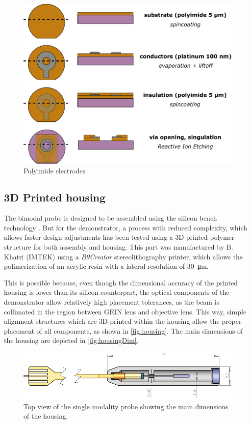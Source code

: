 \documentclass[10pt]{iopart}
\begin{document}
\begin{figure}[h!]\centering \includegraphics[width=\columnwidth]{figures/PIprocess.pdf}
      \caption{Polyimide electrodes}
\end{figure}


\subsection{3D Printed housing}

The bimodal probe is designed to be assembled using the silicon bench technology \cite{Kretschmer}. But for the demonstrator, a process with reduced complexity, which allows faster design adjustments has been tested using a 3D printed polymer structure for both assembly and housing. This part was manufactured by B. Khatri (IMTEK) using a \textit{B9Creator} stereolithography printer, which allows the polimerization of an acrylic resin with a lateral resolution of \SI{30}{\micro\meter}.

This is possible because, even though the dimensional accuracy of the printed housing is lower than its silicon counterpart, the optical components of the demonstrator allow relatively high placement tolerances, as the beam is collimated in the region between GRIN lens and objective lens. This way, simple alignment structures which are 3D-printed within the housing allow the proper placement of all components, as shown in \autoref{fig:housing}. The main dimensions of the housing are depicted in \autoref{fig:housingDim}.


\begin{figure}[h!]\centering \includegraphics[width=\columnwidth]{figures/TopDrawing.pdf}
      \caption{Top view of the single modality probe showing the main dimensions of the housing.}
      \label{fig:housingDim}
\end{figure}
\end{document}
